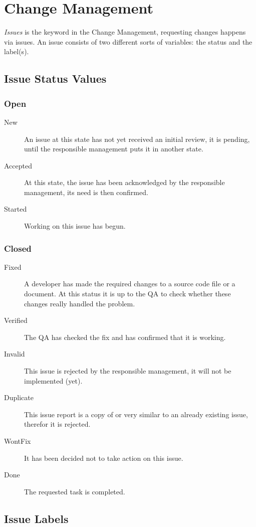 \chapter{Change Management}
{\it Issues} is the keyword in the Change Management, requesting changes happens via issues.
An issue consists of two different sorts of variables: the status and the label(s).

\section{Issue Status Values}
\subsection{Open}
\begin{description}
\item[New]
An issue at this state has not yet received an initial review, it is pending, until the responsible management puts it in another state.
\item[Accepted]
At this state, the issue has been acknowledged by the responsible management, its need is then confirmed.
\item[Started]
Working on this issue has begun.
\end{description}
\subsection{Closed}
\begin{description}
\item[Fixed]
A developer has made the required changes to a source code file or a document.
At this status it is up to the QA to check whether these changes really handled the problem.
\item[Verified]
The QA has checked the fix and has confirmed that it is working.
\item[Invalid]
This issue is rejected by the responsible management, it will not be implemented (yet).
\item[Duplicate]
This issue report is a copy of or very similar to an already existing issue, therefor it is rejected.
\item[WontFix]
It has been decided not to take action on this issue.
\item[Done]
The requested task is completed.
\end{description}

\section{Issue Labels}

